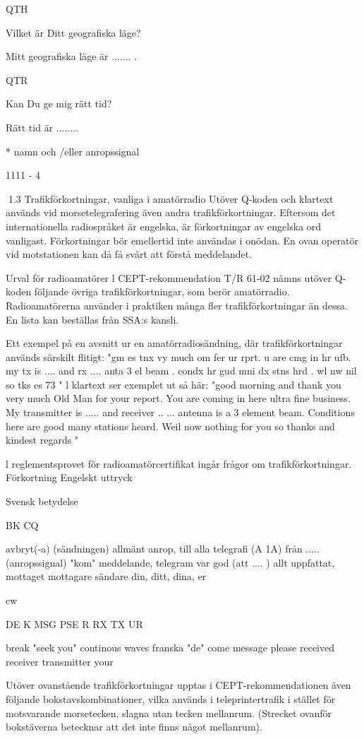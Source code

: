 QTH

Vilket är Ditt geografiska läge?

Mitt geografiska läge är ....... .

QTR

Kan Du ge mig rätt tid?

Rätt tid är ........

* namn och /eller anropssignal

1111 - 4

1.3 Trafikförkortningar, vanliga i amatörradio
Utöver Q-koden och klartext används vid
morsetelegrafering även andra trafikförkortningar. Eftersom det internationella radiospråket är engelska, är förkortningar av engelska ord vanligast.
Förkortningar bör emellertid inte användas i onödan. En ovan operatör vid motstationen kan då få svårt att förstå meddelandet.

Urval för radioamatörer
l CEPT-rekommendation T/R 61-02 nämns
utöver Q-koden följande övriga trafikförkortningar, som berör amatörradio.
Radioamatörerna använder i praktiken
många fler trafikförkortningar än dessa. En
lista kan beställas från SSA:s kansli.

Ett exempel på en avsnitt ur en amatörradiosändning, där trafikförkortningar används
särskilt flitigt:
"gm es tnx vy much om fer ur rprt. u are
cmg in hr ufb. my tx is .... and rx .... anta 3
el beam . condx hr gud mni dx stns hrd . wl
nw nil so tks es 73 "
l klartext ser exemplet ut så här:
"good morning and thank you very much
Old Man for your report. You are coming in
here ultra fine business. My transmitter is .....
and receiver .. ... antenna is a 3 element
beam. Conditions here are good many
stations heard. Weil now nothing for you so
thanks and kindest regards "

l reglementsprovet för radioamatörcertifikat ingår frågor om trafikförkortningar.
Förkortning Engelskt uttryck

Svensk betydelse

BK
CQ

avbryt(-a) (sändningen)
allmänt anrop, till alla
telegrafi (A 1A)
från ..... (anropssignal)
"kom"
meddelande, telegram
var god (att .... )
allt uppfattat, mottaget
mottagare
sändare
din, ditt, dina, er

cw

DE
K
MSG
PSE
R
RX
TX
UR

break
"seek you"
continous waves
franska "de"
come
message
please
received
receiver
transmitter
your

Utöver ovanstående trafikförkortningar upptas i CEPT-rekommendationen även följande bokstavskombinationer, vilka används i
teleprintertrafik i stället för motsvarande
morsetecken, slagna utan tecken mellanrum.
(Strecket ovanför bokstäverna betecknar
att det inte finns något mellanrum).

